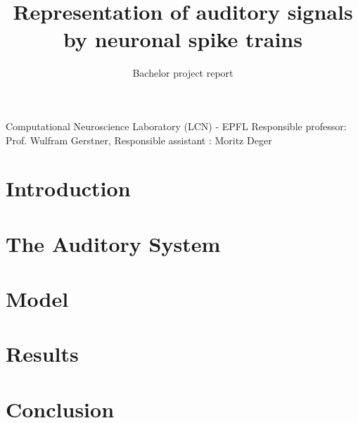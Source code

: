 \documentclass[nocopyrightspace,11pt,authoryear,preprint]{sigplanconf}
\begin{document}

\title{Representation of auditory signals by neuronal spike trains}
\subtitle{Bachelor project report} 

           {Computational Neuroscience Laboratory (LCN) - EPFL}
					 {Responsible professor: Prof. Wulfram Gerstner, 
					Responsible assistant : Moritz Deger}
\maketitle

\section{Introduction}%


\section{The Auditory System}


\section{Model}


\section{Results}


\section{Conclusion}





\end{document}
